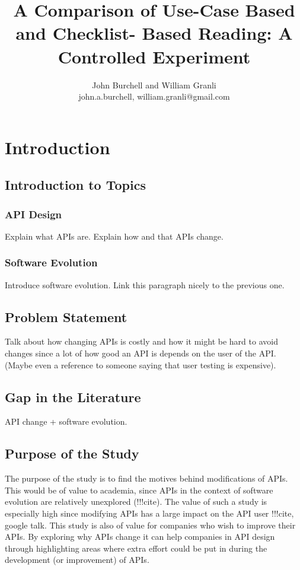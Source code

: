 \documentclass[10pt,twocolumn]{article}
\begin{document}
\title{A Comparison of Use-Case Based and Checklist-
Based Reading: A Controlled Experiment}

\author{John Burchell and William Granli \\
john.a.burchell, william.granli@gmail.com}


\maketitle
\thispagestyle{empty}


\section{Introduction}

\subsection{Introduction to Topics}

\subsubsection{API Design}
Explain what APIs are. 
Explain how and that APIs change. 

\subsubsection{Software Evolution}
Introduce software evolution. 
Link this paragraph nicely to the previous one. 


\subsection{Problem Statement}
Talk about how changing APIs is costly and how it might be hard to avoid changes since a lot of how good an API is depends on the user of the API. (Maybe even a reference to someone saying that user testing is expensive). 

\subsection{Gap in the Literature}
API change + software evolution.

\subsection{Purpose of the Study}
The purpose of the study is to find the motives behind modifications of APIs. This would be of value to academia, since APIs in the context of software evolution are relatively unexplored (!!!cite). The value of such a study is especially high since modifying APIs has a large impact on the API user {!!!cite, google talk}. This study is also of value for companies who wish to improve their APIs. By exploring why APIs change it can help companies in API design through highlighting areas where extra effort could be put in during the development (or improvement) of APIs.  
\end{document}
